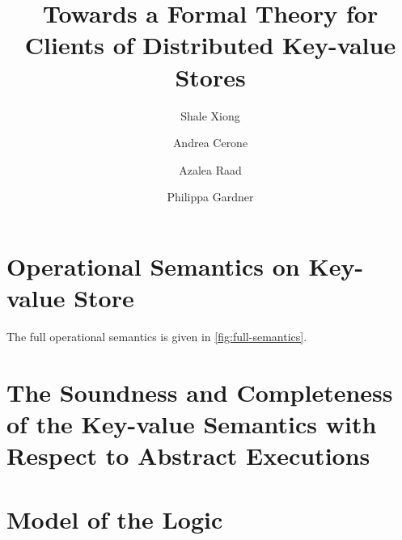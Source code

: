 \documentclass[runningheads]{llncs}
\newif\ifTechReport
\newcommand{\RootPath}{.}
\begin{document}
\title{
	Towards a Formal Theory for Clients of Distributed Key-value Stores
    } 


\author{%
Shale Xiong \and
Andrea Cerone \and
Azalea Raad \and
Philippa Gardner }
%
%


\maketitle

\begin{abstract}
    
\end{abstract}





\ifTechReport




\fi

%




\newpage
\appendix
\ifTechReport
\else
\section{Operational Semantics on Key-value Store}
\label{sec:full-semantics}
The full operational semantics is given in \cref{fig:full-semantics}.



\section{The Soundness and Completeness of the Key-value Semantics with Respect to Abstract Executions}
\label{sec:kv-sound-complete-proof}



\section{Model of the Logic}
\label{sec:model-of-logic}





\fi
\end{document}

